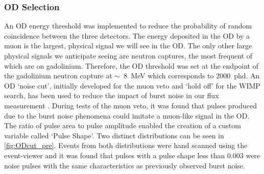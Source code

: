 \subsubsection{OD Selection}
An OD energy threshold was implemented to reduce the probability of random coincidence between the three detectors. The energy deposited in the OD by a muon is the largest, physical signal we will see in the OD. The only other large physical signals we anticipate seeing are neutron captures, the most frequent of which are on gadolinium. Therefore, the OD threshold was set at the endpoint of the gadolinium neutron capture at $\sim$~8~MeV which corresponds to 2000~phd.
An OD `noise cut', initially developed for the muon veto and `hold off' for the WIMP search, has been used to reduce the impact of burst noise in our flux measurement \cite{MuonVetoCCLZDocs}. During tests of the muon veto, it was found that pulses produced due to the burst noise phenomena could imitate a muon-like signal in the OD. The ratio of pulse area to pulse amplitude enabled the creation of a custom variable called `Pulse Shape'.
Two distinct distributions can be seen in \autoref{fig:ODcut_pre}. Events from both distributions were hand scanned using the event-viewer and it was found that pulses with a pulse shape less than 0.003 were noise pulses with the same characteristics as previously observed burst noise. 

